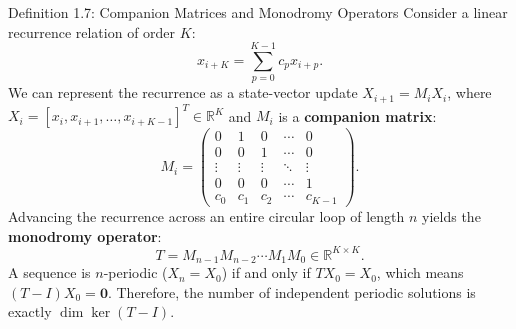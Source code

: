 \documentclass[11pt]{article}
\begin{document}
\begin{defbox}{Definition 1.7: Companion Matrices and Monodromy Operators}
Consider a linear recurrence relation of order $K$:
\begin{equation}
  x_{i+K} = \sum_{p=0}^{K-1} c_p x_{i+p}.
\end{equation}
We can represent the recurrence as a state-vector update $X_{i+1} = M_i X_i$, where $X_i = [x_i, x_{i+1}, \dots, x_{i+K-1}]^T \in \mathbb{R}^K$ and $M_i$ is a \textbf{companion matrix}:
\begin{equation}
  M_i = \begin{pmatrix}
    0 & 1 & 0 & \cdots & 0 \\
    0 & 0 & 1 & \cdots & 0 \\
    \vdots & \vdots & \vdots & \ddots & \vdots \\
    0 & 0 & 0 & \cdots & 1 \\
    c_0 & c_1 & c_2 & \cdots & c_{K-1}
  \end{pmatrix}.
\end{equation}
Advancing the recurrence across an entire circular loop of length $n$ yields the \textbf{monodromy operator}:
\begin{equation}
  T = M_{n-1} M_{n-2} \cdots M_1 M_0 \in \mathbb{R}^{K \times K}.
\end{equation}
A sequence is $n$-periodic ($X_n = X_0$) if and only if $T X_0 = X_0$, which means $(T - I)X_0 = \mathbf{0}$. Therefore, the number of independent periodic solutions is exactly $\dim\ker(T - I)$.
\end{defbox}
\end{document}
